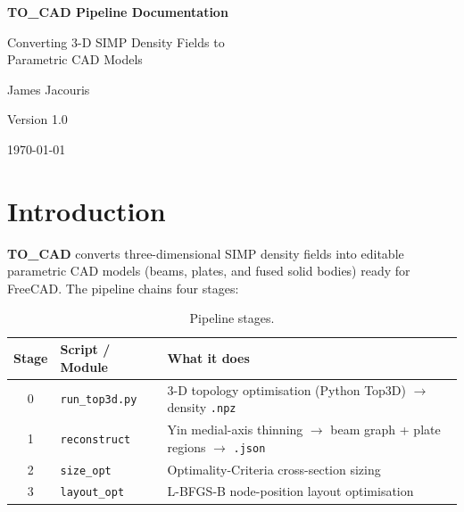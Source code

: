 \documentclass[a4paper, 11pt, openany]{report}
\begin{document}
\begin{titlepage}
\centering
\vspace*{4cm}
{\Huge\bfseries TO\_CAD Pipeline Documentation\par}
\vspace{1cm}
{\Large Converting 3-D SIMP Density Fields to\\Parametric CAD Models\par}
\vspace{2cm}
{\large James Jacouris\par}
\vspace{1cm}
{\large Version 1.0\par}
\vspace{0.5cm}
{\large \today\par}
\vfill
\end{titlepage}

\tableofcontents
\listoffigures
\listoftables

\chapter{Introduction}
\label{ch:introduction}

\textbf{TO\_CAD} converts three-dimensional SIMP density fields into editable
parametric CAD models (beams, plates, and fused solid bodies) ready for
FreeCAD.  The pipeline chains four stages:

\begin{table}[htbp]
\caption{Pipeline stages.}
\label{tab:pipeline-stages}
\centering
\begin{tabularx}{\textwidth}{clX}
\toprule
Stage & Script / Module & What it does \\
\midrule
0 & \texttt{run\_top3d.py} & 3-D topology optimisation (Python Top3D) $\to$ density \texttt{.npz} \\
1 & \texttt{reconstruct} & Yin medial-axis thinning $\to$ beam graph + plate regions $\to$ \texttt{.json} \\
2 & \texttt{size\_opt} & Optimality-Criteria cross-section sizing \\
3 & \texttt{layout\_opt} & L-BFGS-B node-position layout optimisation \\
\bottomrule
\end{tabularx}
\end{table}
\end{document}
